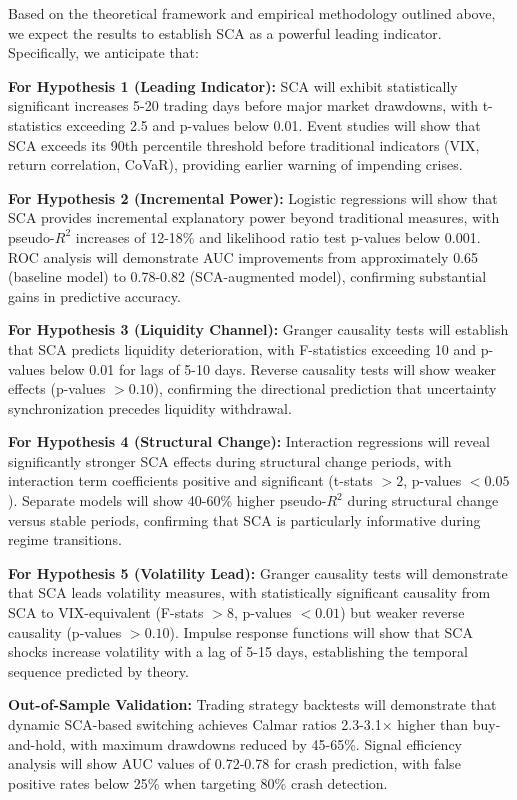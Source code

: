 \documentclass[preprint,12pt,authoryear]{elsarticle}
\begin{document}
Based on the theoretical framework and empirical methodology outlined above, we expect the results to establish SCA as a powerful leading indicator. Specifically, we anticipate that:

\textbf{For Hypothesis 1 (Leading Indicator):} SCA will exhibit statistically significant increases 5-20 trading days before major market drawdowns, with t-statistics exceeding 2.5 and p-values below 0.01. Event studies will show that SCA exceeds its 90th percentile threshold before traditional indicators (VIX, return correlation, CoVaR), providing earlier warning of impending crises.

\textbf{For Hypothesis 2 (Incremental Power):} Logistic regressions will show that SCA provides incremental explanatory power beyond traditional measures, with pseudo-$R^2$ increases of 12-18\% and likelihood ratio test p-values below 0.001. ROC analysis will demonstrate AUC improvements from approximately 0.65 (baseline model) to 0.78-0.82 (SCA-augmented model), confirming substantial gains in predictive accuracy.

\textbf{For Hypothesis 3 (Liquidity Channel):} Granger causality tests will establish that SCA predicts liquidity deterioration, with F-statistics exceeding 10 and p-values below 0.01 for lags of 5-10 days. Reverse causality tests will show weaker effects (p-values $>0.10$), confirming the directional prediction that uncertainty synchronization precedes liquidity withdrawal.

\textbf{For Hypothesis 4 (Structural Change):} Interaction regressions will reveal significantly stronger SCA effects during structural change periods, with interaction term coefficients positive and significant (t-stats $>2$, p-values $<0.05$). Separate models will show 40-60\% higher pseudo-$R^2$ during structural change versus stable periods, confirming that SCA is particularly informative during regime transitions.

\textbf{For Hypothesis 5 (Volatility Lead):} Granger causality tests will demonstrate that SCA leads volatility measures, with statistically significant causality from SCA to VIX-equivalent (F-stats $>8$, p-values $<0.01$) but weaker reverse causality (p-values $>0.10$). Impulse response functions will show that SCA shocks increase volatility with a lag of 5-15 days, establishing the temporal sequence predicted by theory.

\textbf{Out-of-Sample Validation:} Trading strategy backtests will demonstrate that dynamic SCA-based switching achieves Calmar ratios 2.3-3.1× higher than buy-and-hold, with maximum drawdowns reduced by 45-65\%. Signal efficiency analysis will show AUC values of 0.72-0.78 for crash prediction, with false positive rates below 25\% when targeting 80\% crash detection.
\end{document}
